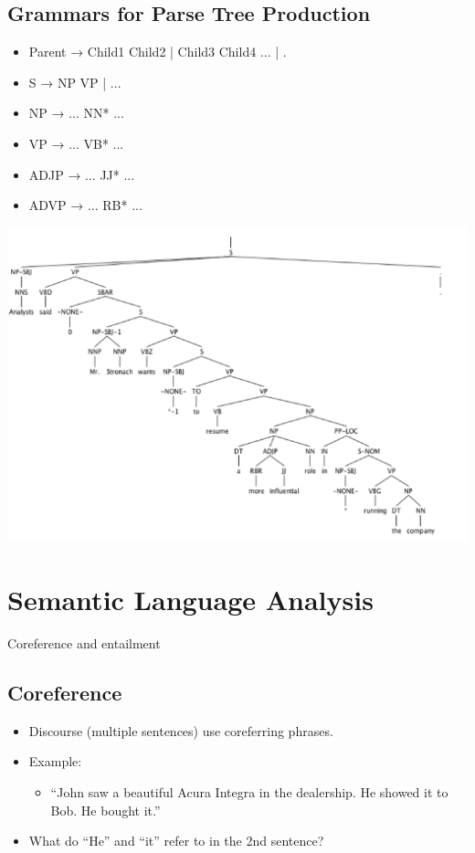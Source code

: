 \documentclass[11pt]{article}
\theoremstyle{definition}
\begin{document}
\subsection{Grammars for Parse Tree Production}
\begin{itemize}
  \item Parent → Child1 Child2 | Child3 Child4 ... | .
  \item S → NP VP | ...
  \item NP → ... NN* ...
  \item VP → ... VB* ...
  \item ADJP → ... JJ* ...
  \item ADVP → ... RB* ...
\end{itemize}

\includegraphics[width=\textwidth/2]{3.png}

\section{Semantic
Language Analysis}
Coreference and
entailment

\subsection{Coreference}
\begin{itemize}
  \item Discourse (multiple sentences) use coreferring phrases.
  \item Example:
  \begin{itemize}
    \item “John saw a beautiful Acura Integra in the dealership.
    He showed it to Bob.
    He bought it.”
  \end{itemize}
  \item What do “He” and “it” refer to in the 2nd sentence?
\end{itemize}
\end{document}
